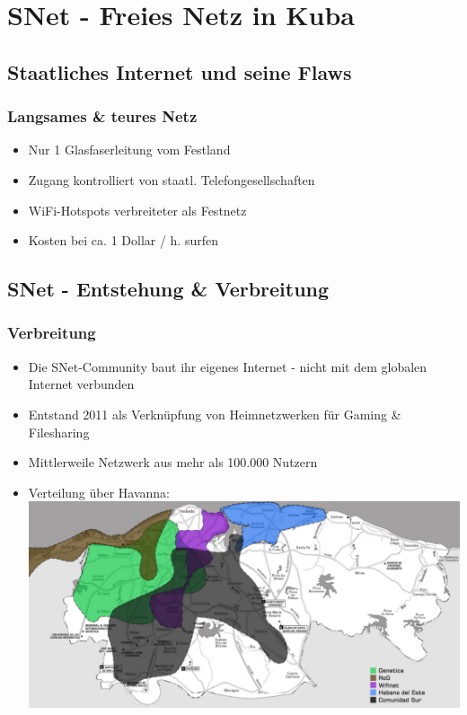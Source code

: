 \section{SNet - Freies Netz in Kuba}
\subsection{Staatliches Internet und seine Flaws}

\begin{frame}
\frametitle{Langsames \& teures Netz}
	\begin{itemize}
		\item Nur 1 Glasfaserleitung vom Festland
		\item Zugang kontrolliert von staatl. Telefongesellschaften
		\item WiFi-Hotspots verbreiteter als Festnetz
		\item Kosten bei ca. 1 Dollar / h. surfen
	\end{itemize}
\end{frame}



\subsection{SNet - Entstehung \& Verbreitung}

\begin{frame}
\frametitle{Verbreitung}
	\begin{itemize}
		\item Die SNet-Community baut ihr eigenes Internet - nicht mit dem globalen Internet verbunden
		\item Entstand 2011 als Verknüpfung von Heimnetzwerken für Gaming \& Filesharing
		\item Mittlerweile Netzwerk aus mehr als 100.000 Nutzern
		\item Verteilung über Havanna:
			\includegraphics[width=\textwidth]{images/havanna_net.jpg}
	\end{itemize}
	
\end{frame}

